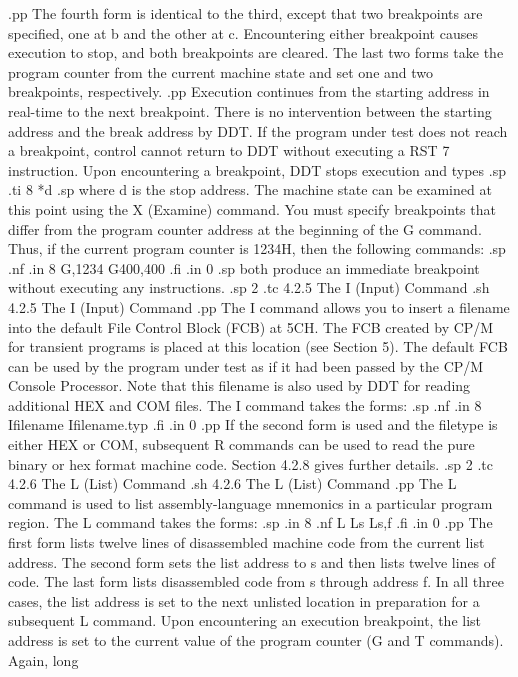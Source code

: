 .pp
The fourth form is identical to the third, except that two 
breakpoints are specified, one at b and the other at c.  
Encountering either breakpoint causes execution to stop, and both 
breakpoints are cleared.  The last two forms take the program 
counter from the current machine state and set one and two 
breakpoints, respectively.
.pp
Execution continues from the starting address in real-time to the 
next breakpoint.  There is no intervention between the starting 
address and the break address by DDT.  If the program under test 
does not reach a breakpoint, control cannot return to DDT without 
executing a RST 7 instruction.  Upon encountering a breakpoint, 
DDT stops execution and types
.sp
.ti 8
*d
.sp
where d is the stop address.  The machine state can be examined 
at this point using the X (Examine) command.  You must 
specify breakpoints that differ from the program counter address 
at the beginning of the G command.  Thus, if the current program 
counter is 1234H, then the following commands:
.sp
.nf
.in 8
G,1234
G400,400
.fi
.in 0
.sp 
both produce an immediate breakpoint without executing any 
instructions.
.sp 2
.tc         4.2.5  The I (Input) Command
.sh
4.2.5  The I (Input) Command
.pp
The I command allows you to insert a filename into the default 
File Control Block (FCB) at 5CH.  The FCB created by CP/M for 
transient programs is placed at this location (see Section 5).  
The default FCB can be used by the program under test as if it 
had been passed by the CP/M Console Processor.  Note that this 
filename is also used by DDT for reading additional HEX and COM 
files.  The I command takes the forms:
.sp
.nf
.in 8
Ifilename
Ifilename.typ
.fi
.in 0
.pp
If the second form is used and the filetype is either HEX or COM, 
subsequent R commands can be used to read the pure binary or hex 
format machine code.  Section 4.2.8 gives further details.
.sp 2
.tc         4.2.6  The L (List) Command
.sh
4.2.6  The L (List) Command
.pp
The L command is used to list assembly-language mnemonics in a 
particular program region.  The L command takes the forms:
.sp 
.in 8
.nf
L
Ls
Ls,f
.fi
.in 0
.pp
The first form lists twelve lines of disassembled machine code 
from the current list address.  The second form sets the list 
address to s and then lists twelve lines of code.  The last form 
lists disassembled code from s through address f.  In all three 
cases, the list address is set to the next unlisted location in 
preparation for a subsequent L command.  Upon encountering an 
execution breakpoint, the list address is set to the current 
value of the program counter (G and T commands).  Again, long 
